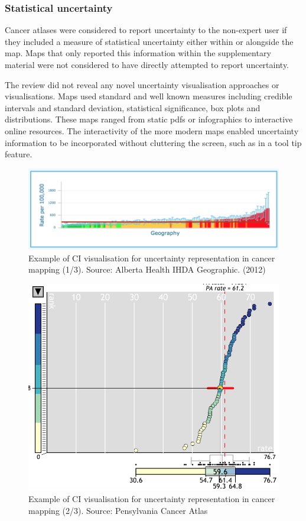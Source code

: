 \documentclass[11pt,]{article}
\begin{document}
\hypertarget{statistical-uncertainty}{%
\subsubsection{Statistical uncertainty}\label{statistical-uncertainty}}

Cancer atlases were considered to report uncertainty to the non-expert
user if they included a measure of statistical uncertainty either within
or alongside the map. Maps that only reported this information within
the supplementary material were not considered to have directly
attempted to report uncertainty.

The review did not reveal any novel uncertainty visualisation approaches
or visualisations. Maps used standard and well known measures including
credible intervals and standard deviation, statistical significance, box
plots and distributions. These maps ranged from static pdfs or
infographics to interactive online resources. The interactivity of the
more modern maps enabled uncertainty information to be incorporated
without cluttering the screen, such as in a tool tip feature.

\begin{figure}

{\centering \includegraphics[width=0.8\linewidth]{figures/Alberta_CI_viz} 

}

\caption{Example of CI visualisation for uncertainty representation in cancer mapping (1/3). Source: Alberta Health IHDA Geographic. (2012) }\label{fig:ci-viz2}
\end{figure}

\begin{figure}

{\centering \includegraphics[width=0.55\linewidth]{figures/Pennsylvania_CI_viz} 

}

\caption{Example of CI visualisation for uncertainty representation in cancer mapping (2/3). Source: Pensylvania Cancer Atlas }\label{fig:ci-viz3}
\end{figure}
\end{document}
